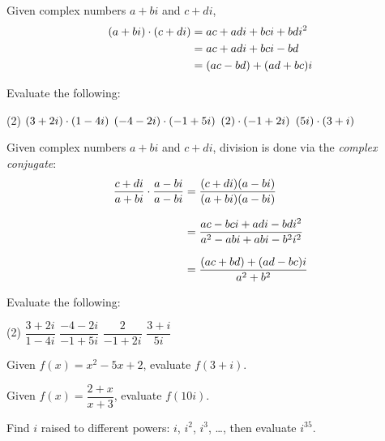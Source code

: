 \documentclass[../mathNotesPreamble]{subfiles}
\begin{document}
  \begin{defn*}
    Given complex numbers $a+bi$ and $c+di$,
    \begin{align*}
      {\left(a+bi\right)}\cdot{\left(c+di\right)}&=ac+adi+bci+bdi^2\\
        &=ac+adi+bci-bd\\
        &={\left(ac-bd\right)}+{\left(ad+bc\right)}i
    \end{align*}
  \end{defn*}
  \begin{ex*}
    Evaluate the following:
    \begin{extasks}[after-item-skip=\stretch{1}](2)
      \task ${\left(3+2i\right)}\cdot{\left(1-4i\right)}$
      \task ${\left(-4-2i\right)}\cdot{\left(-1+5i\right)}$
      \task ${\left(2\right)}\cdot{\left(-1+2i\right)}$
      \task ${\left(5i\right)}\cdot{\left(3+i\right)}$
    \end{extasks}
  \end{ex*}
  \pagebreak

  \begin{defn*}
    Given complex numbers $a+bi$ and $c+di$, division is done via the \emph{complex conjugate}:
    \begin{align*}
      \dfrac{c+di}{a+bi}\cdot\dfrac{a-bi}{a-bi}&=\dfrac{{\left(c+di\right)}{\left(a-bi\right)}}{{\left(a+bi\right)}{\left(a-bi\right)}}\\[7.5pt]
        &=\dfrac{ac-bci+adi-bdi^2}{a^2-abi+abi-b^2i^2}\\[7.5pt]
        &=\dfrac{{\left(ac+bd\right)}+{\left(ad-bc\right)}i}{a^2+b^2}
    \end{align*}
  \end{defn*}
  \begin{ex*}
    Evaluate the following:
    \begin{extasks}[after-item-skip=\stretch{1}](2)
      \task $\dfrac{3+2i}{1-4i}$
      \task $\dfrac{-4-2i}{-1+5i}$
      \task $\dfrac{2}{-1+2i}$
      \task $\dfrac{3+i}{5i}$
    \end{extasks}
  \end{ex*}
  \pagebreak

  \begin{ex*}
    Given $f(x)=x^2-5x+2$, evaluate $f(3+i)$.
  \end{ex*}
  \begin{ex*}
    Given $f(x)=\dfrac{2+x}{x+3}$, evaluate $f(10i)$.
  \end{ex*}
  \pagebreak

  \begin{ex*}
    Find $i$ raised to different powers: $i$, $i^2$, $i^3$, \dots, then evaluate $i^{35}$.
  \end{ex*}

  \pagebreak
\end{document}
